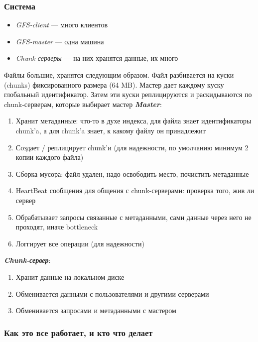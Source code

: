 \documentclass[12pt]{article}
\begin{document}
    \subsubsection{Система}
    \begin{itemize}
        \item \textit{GFS-client} --- много клиентов
        \item \textit{GFS-master} --- одна машина
        \item \textit{Chunk-серверы} --- на них хранятся данные, их много
    \end{itemize}
    \quad Файлы большие, хранятся следующим образом. Файл разбивается на куски (chunks) фиксированного размера (64 MB). Мастер дает каждому куску глобальный идентификатор. Затем эти куски реплицируются и раскидываются по chunk-серверам, которые выбирает мастер
    \newpage
    \textbf{\textit{Master}}:
    \begin{enumerate}
        \item Хранит метаданные: что-то в духе индекса, для файла знает идентификаторы chunk'a, а для chunk'a знает, к какому файлу он принадлежит
        \item Создает / реплицирует chunk'и (для надежности, по умолчанию минимум 2 копии каждого файла)
        \item Сборка мусора: файл удален, надо освободить место, почистить метаданные
        \item HeartBeat сообщения для общения с chunk-серверами: проверка того, жив ли сервер
        \item Обрабатывает запросы связанные с метаданными, сами данные через него не проходят, иначе bottleneck
        \item Логгирует все операции (для надежности)
    \end{enumerate}
    \textbf{\textit{Chunk-сервер}}:
    \begin{enumerate}
        \item Хранит данные на локальном диске
        \item Обменивается данными с пользователями и другими серверами
        \item Обменивается запросами и метаданными с мастером
    \end{enumerate}
    
    \subsubsection{Как это все работает, и кто что делает}
    
\end{document}
